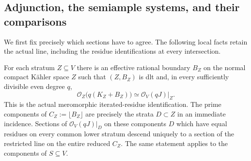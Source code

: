\subsection{Adjunction, the semiample systems, and their comparisons}

We first fix precisely which sections have to agree.  The following local
facts retain the actual line, including the residue identifications at
every intersection.

\begin{lemma}\label{floor:adjunction}
For each stratum \(Z\subseteq V\) there is an effective rational boundary
\(B_Z\) on the normal compact K\"ahler space \(Z\) such that \((Z,B_Z)\)
is dlt and, in every sufficiently divisible even degree \(q\),
\begin{equation}\label{floor:residue-line}
 \mathcal O_Z\bigl(q(K_Z+B_Z)\bigr)
       \simeq \mathcal O_V(qJ)|_Z.
\end{equation}
This is the actual meromorphic iterated-residue identification.  The prime
components of \(C_Z:=\lfloor B_Z\rfloor\) are precisely the strata
\(D\subset Z\) in an immediate incidence.  Sections of \(\mathcal O_V(qJ)|_D\) on
these components \(D\) which have equal residues on every common lower
stratum descend uniquely to a section of the restricted line on the entire
reduced \(C_Z\).  The same statement applies to the components of
\(S\subseteq V\).
\end{lemma}

